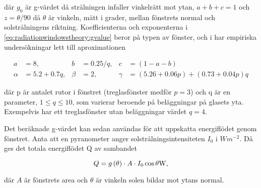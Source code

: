 där $g_0$ är g-värdet då strålningen infaller vinkelrätt mot ytan, $a+b+c=1$ och $z=\theta/90$ då $\theta$ är vinkeln, mätt i grader, mellan fönstrets normal och solstrålningens riktning. Koefficienterna och exponenterna i \eqref{eq:radiationwindowstheory:gvalue} beror på typen av fönster, och i \cite{karlssonroos99} har empiriska undersökningar lett till aproximationen

\begin{align}\label{eq:gconstants}
a & = 8, & b & = 0.25/q, & c & = (1-a-b) \nonumber \\
\alpha & = 5.2 + 0.7q, & \beta & = 2, & \gamma & = (5.26+0.06p) + (0.73+0.04p)q
\end{align}

där p är antalet rutor i fönstret (treglasfönster medför $p = 3$) och q är en parameter, $1 \le q \le 10$, som varierar beroende på beläggningar på glasets yta. Exempelvis har ett treglasfönster utan beläggningar värdet $q=4$.

Det beräknade g-värdet kan sedan användas för att uppskatta energiflödet genom fönstret. Anta att en pyranometer anger solstrålningsintensiteten $I_0$ i $\unit{W m^{-2}}$. Då ges det totala energiflödet Q av sambandet 

\begin{equation}\label{eq:totalsun}
Q = g \left( \theta \right)\cdot A \cdot I_0 \cos{\theta} \unit[]{W},
\end{equation}

där $A$ är fönstrets area och $\theta$ är vinkeln solen bildar mot ytans normal.
